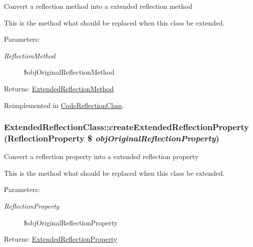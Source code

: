 Convert a reflection method into a extended reflection method

This is the method what should be replaced when this class be extended.

\begin{Desc}
\item[Parameters:]
\begin{description}
\item[{\em ReflectionMethod}]\$objOriginalReflectionMethod \end{description}
\end{Desc}
\begin{Desc}
\item[Returns:]\hyperlink{class_extended_reflection_method}{ExtendedReflectionMethod} \end{Desc}


Reimplemented in \hyperlink{class_code_reflection_class_c8e58a7369660bf8f63ce39f3b9b5271}{CodeReflectionClass}.\hypertarget{class_extended_reflection_class_6259683f3d0f9583ec36ca51f6e964f9}{
\subsubsection[{createExtendedReflectionProperty}]{\setlength{\rightskip}{0pt plus 5cm}ExtendedReflectionClass::createExtendedReflectionProperty (ReflectionProperty \$ {\em objOriginalReflectionProperty})}}
\label{class_extended_reflection_class_6259683f3d0f9583ec36ca51f6e964f9}


Convert a reflection property into a extended reflection property

This is the method what should be replaced when this class be extended.

\begin{Desc}
\item[Parameters:]
\begin{description}
\item[{\em ReflectionProperty}]\$objOriginalReflectionProperty \end{description}
\end{Desc}
\begin{Desc}
\item[Returns:]\hyperlink{class_extended_reflection_property}{ExtendedReflectionProperty} \end{Desc}


